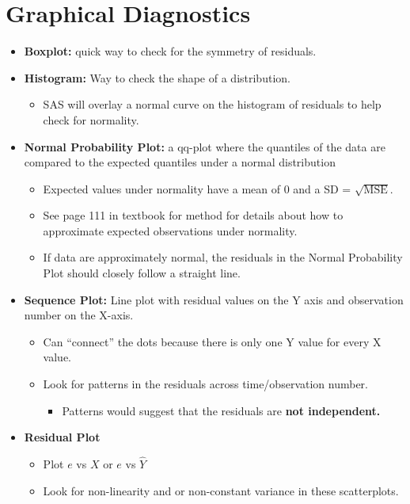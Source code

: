 \documentclass[12pt]{../notes}
\begin{document}
\section{Graphical Diagnostics}
\begin{itemize}
\item \textbf{Boxplot:} quick way to check for the symmetry of residuals. 
\item \textbf{Histogram:} Way to check the shape of a distribution. 
\begin{itemize}
\item SAS will overlay a normal curve on the histogram of residuals to help check for normality. 
\end{itemize}
\item \textbf{Normal Probability Plot:} a qq-plot where the quantiles of the data are compared to the expected quantiles under a normal distribution
\begin{itemize}
\item Expected values under normality have a mean of $0$ and a SD = $\sqrt{\text{MSE}}.$
\item See page 111 in textbook for method for details about how to approximate expected observations under normality.  
\item If data are approximately normal, the residuals in the Normal Probability Plot should closely follow a straight line. 
\end{itemize}
\item \textbf{Sequence Plot:} Line plot with residual values on the Y axis and observation number on the X-axis. 
\begin{itemize}
\item Can ``connect'' the dots because there is only one Y value for every X value. 
\item Look for patterns in the residuals across time/observation number. 
\begin{itemize}
\item Patterns would suggest that the residuals are \textbf{not independent.}
\end{itemize}
\end{itemize}
\item \textbf{Residual Plot}
\begin{itemize}
\item Plot $e$ vs $X$ or $e$ vs $\hat{Y}$
\item Look for non-linearity and or non-constant variance in these scatterplots.  
\end{itemize}
\end{itemize}
\end{document}

